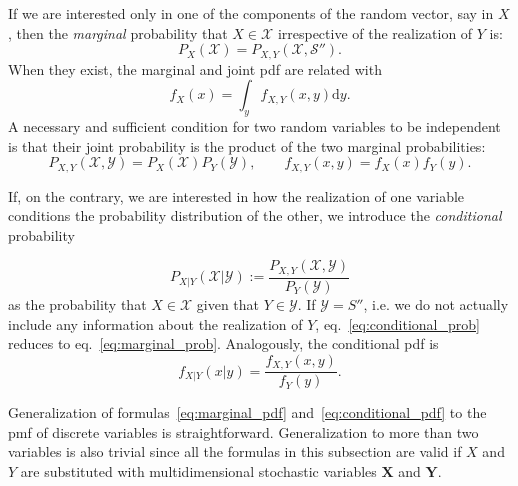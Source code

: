 \documentclass[a4paper,12pt]{book}
\begin{document}
If we are interested only in one of the components of the random vector, say in $X$, then the \textit{marginal} probability that $X \in \mathcal{X}$ irrespective of the realization of $Y$ is: 
\begin{equation}
    \label{eq:marginal_prob}
    P_{X}(\mathcal{X}) = P_{X,Y}(\mathcal{X},\mathcal{S''}).
\end{equation}
When they exist, the marginal and joint \acrshort{pdf} are related with
\begin{equation}
    \label{eq:marginal_pdf}
    f_{X}(x) = \int_y f_{X,Y}(x,y)\mathrm{d}y.
\end{equation}
A necessary and sufficient condition for two random variables to be independent is that their joint probability is the product of the two marginal probabilities:
\begin{equation}
    P_{X,Y}(\mathcal{X},\mathcal{Y}) = P_X(\mathcal{X})P_Y(\mathcal{Y}), \quad \quad f_{X,Y}(x,y)= f_X(x)f_Y(y).
\end{equation}


If, on the contrary, we are interested in how the realization of one variable conditions the probability distribution of the other, we introduce the \textit{conditional} probability 

\begin{equation}
    \label{eq:conditional_prob}
    P_{X|Y}(\mathcal{X}|\mathcal{Y}) := \frac{P_{X,Y}(\mathcal{X},\mathcal{Y})}{P_Y(\mathcal{Y})}
\end{equation}
as the probability that $X\in \mathcal{X}$ given that $Y\in \mathcal{Y}$. If $\mathcal{Y} = S''$, i.e. we do not actually include any information about the realization of $Y$, eq.~\eqref{eq:conditional_prob} reduces to eq.~\eqref{eq:marginal_prob}.
Analogously, the conditional \acrshort{pdf} is 
\begin{equation}
    \label{eq:conditional_pdf}
    f_{X|Y}(x|y) = \frac{f_{X,Y}(x,y)}{f_Y(y)}.
\end{equation}

Generalization of formulas~\eqref{eq:marginal_pdf} and~\eqref{eq:conditional_pdf} to the \acrshort{pmf} of discrete variables is straightforward. Generalization to more than two variables is also trivial since all the formulas in this subsection are valid if $X$ and $Y$ are substituted with multidimensional stochastic variables $\bm{X}$ and $\bm{Y}$.
\end{document}
